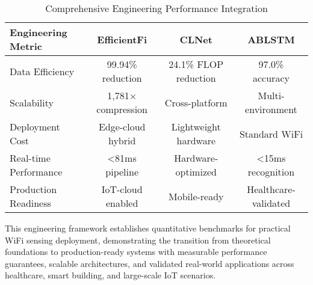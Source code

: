 \documentclass[journal]{IEEEtran}
\begin{document}
{\begin{table}[h]
\centering
\begin{tabular}{|l|c|c|c|}
\hline
\textbf{Engineering Metric} & \textbf{EfficientFi} & \textbf{CLNet} & \textbf{ABLSTM} \\
\hline
Data Efficiency & 99.94\% reduction & 24.1\% FLOP reduction & 97.0\% accuracy \\
Scalability & 1,781× compression & Cross-platform & Multi-environment \\
Deployment Cost & Edge-cloud hybrid & Lightweight hardware & Standard WiFi \\
Real-time Performance & <81ms pipeline & Hardware-optimized & <15ms recognition \\
Production Readiness & IoT-cloud enabled & Mobile-ready & Healthcare-validated \\
\hline
\end{tabular}
\caption{Comprehensive Engineering Performance Integration}
\label{tab:engineering_summary}
\end{table}

This engineering framework establishes quantitative benchmarks for practical WiFi sensing deployment, demonstrating the transition from theoretical foundations to production-ready systems with measurable performance guarantees, scalable architectures, and validated real-world applications across healthcare, smart building, and large-scale IoT scenarios.

}
\end{document}
